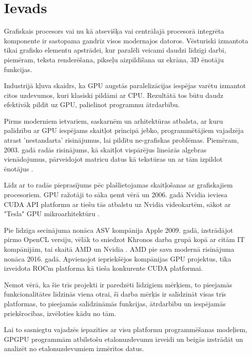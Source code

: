 \documentclass[12pt]{report}%
\theoremstyle{definition}
\begin{document}
\printnomenclature

\chapter{Ievads}
Grafiskais procesors vai nu kā atsevišķa vai centrālajā procesorā integrēta
komponente ir sastopama gandrīz visos modernajos datoros. Vēsturiski izmantota
tikai grafisko elementu apstrādei, kur paralēli veicami daudzi līdzīgi darbi,
piemēram, teksta renderēšana, pikseļu aizpildīšana uz ekrāna, 3D ēnotāju
funkcijas.

Industrijā kļuva skaidrs, ka GPU augstās paralelizācijas iespējas varētu izmantot citos
uzdevumos, kuri klasiski pildāmi ar CPU. Rezultātā tos būtu daudz efektīvāk
pildīt uz GPU, palielinot programmu ātrdarbību.

Pirms moderniem ietvariem, saskarnēm un arhitektūras atbalsta, ar kuru
palīdzību ar GPU iespējams skaitļot principā jebko, programmētājiem vajadzēja
atrast 'nestandarta' risinājumus, lai pildītu ne-grafiskas problēmas. Piemēram,
2003. gadā radās risinājums, kā skaitļot vispārējus lineārās algebras
vienādojumus, pārveidojot matricu datus kā tekstūras un ar tām izpildot
ēnotājus \cite{10.1145/882262.882363}.

Līdz ar to radās pieprasījums pēc plašlietojamas skaitļošanas ar grafiskajiem
procesoriem. GPU ražotāji to sāka ņemt vērā un 2006. gadā Nvidia ieviesa CUDA
API platformu ar tiešu tās atbalstu uz Nvidia  videokartēm, sākot ar "Tesla"
GPU mikroarhitektūru \cite{nvidia_tesla_p100}.

Pie līdzīga secinājuma nonāca ASV kompānija Apple 2009. gadā, izstrādājot pirmo
OpenCL versiju, vēlāk to sniedzot Khronos darba grupā kopā ar citām IT
kompānijām, tai skaitā AMD un Nvidia \cite{khronos_proposal}. AMD pie sava 
modernā risinājuma nonāca 2016. gadā. Apvienojot iepriekšējos kompānijas GPU
projektus, tika izveidota ROCm platforma kā tieša konkurente CUDA platformai.

Ņemot vērā, ka šie trīs projekti ir paredzēti līdzīgiem mērķiem, to pieejamās
funkcionalitātes līdzinās viena otrai, šī darba mērķis ir salīdzināt visas trīs
platformas, to pieejamās salīdzināmās funkcijas, ātrdarbību un iespējamās
priekšrocības, izvēloties kādu no tām.

Lai to sasniegtu vajadzēs iepazīties ar visu platformu programmēšanas modeļiem,
GPGPU programmām atbilstošu etalonuzdevumu izveidi un beigās izstrādāt un
analizēt no etalonuzdevumiem izmērītos datus.







\end{document}
